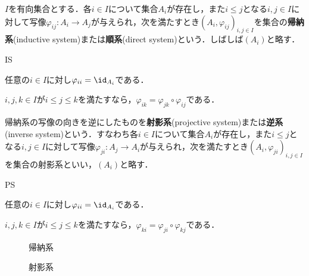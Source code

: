 \begin{defi}[帰納系]
	$I$を有向集合とする．各$i\in I$について集合$A_i$が存在し，また$i\leq j$となる$i,j\in I$に対して写像$\varphi_{ij}:A_i\to A_j$が与えられ，次を満たすとき$(A_i,\varphi_{ij})_{i,j\in I}$を集合の\textbf{帰納系}(inductive system)または\textbf{順系}(direct system)という．しばしば$(A_i)$と略す．
	\begin{defiterm}{IS}
		\item 任意の$i\in I$に対し$\varphi_{ii}=\id_{A_i}$である．
		\item $i,j,k\in I$が$i\leq j\leq k$を満たすなら，$\varphi_{ik}=\varphi_{jk}\circ\varphi_{ij}$である．
	\end{defiterm}
\end{defi}

\begin{defi}[射影系]
	帰納系の写像の向きを逆にしたものを\textbf{射影系}(projective system)または\textbf{逆系}(inverse system)という．すなわち各$i\in I$について集合$A_i$が存在し，また$i\leq j$となる$i,j\in I$に対して写像$\varphi_{ji}:A_j\to A_i$が与えられ，次を満たすとき$(A_i,\varphi_{ji})_{i,j\in I}$を集合の射影系といい，$(A_i)$と略す．
	\begin{defiterm}{PS}
		\item 任意の$i\in I$に対し$\varphi_{ii}=\id_{A_i}$である．
		\item $i,j,k\in I$が$i\leq j\leq k$を満たすなら，$\varphi_{ki}=\varphi_{ji}\circ\varphi_{kj}$である．
	\end{defiterm}
\end{defi}

\begin{minipage}{.4\hsize}
	\begin{figure}[H]
		\centering
		\caption{帰納系}
	\end{figure}
\end{minipage}
\hspace{\fill}
\begin{minipage}{.4\hsize}
	\begin{figure}[H]
		\centering
		\caption{射影系}
	\end{figure}
\end{minipage}

